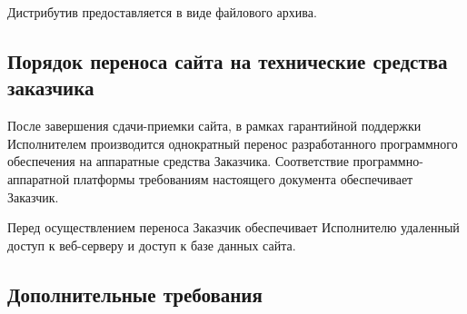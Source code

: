 Дистрибутив предоставляется в виде файлового архива.

\subsection{Порядок переноса сайта на технические средства заказчика}

После завершения сдачи-приемки сайта, в рамках гарантийной поддержки Исполнителем производится однократный перенос разработанного программного обеспечения на аппаратные средства Заказчика. Соответствие программно-аппаратной платформы требованиям настоящего документа обеспечивает Заказчик.

Перед осуществлением переноса Заказчик обеспечивает Исполнителю удаленный доступ к веб-серверу и доступ к базе данных сайта.

\subsection{Дополнительные требования}
